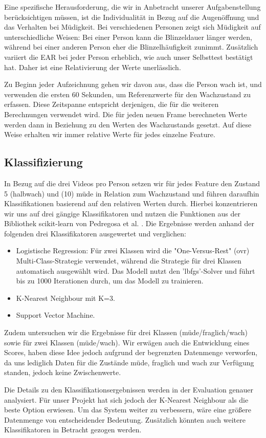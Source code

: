 Eine spezifische Herausforderung, die wir in Anbetracht unserer Aufgabenstellung berücksichtigen müssen, ist die Individualität in Bezug auf die Augenöffnung und das Verhalten bei Müdigkeit. Bei verschiedenen Personen zeigt sich Müdigkeit auf unterschiedliche Weisen: Bei einer Person kann die Blinzeldauer länger werden, während bei einer anderen Person eher die Blinzelhäufigkeit zunimmt. Zusätzlich variiert die EAR bei jeder Person erheblich, wie auch unser Selbsttest bestätigt hat. Daher ist eine Relativierung der Werte unerlässlich.

Zu Beginn jeder Aufzeichnung gehen wir davon aus, dass die Person wach ist, und verwenden die ersten 60 Sekunden, um Referenzwerte für den Wachzustand zu erfassen. Diese Zeitspanne entspricht derjenigen, die für die weiteren Berechnungen verwendet wird. Die für jeden neuen Frame berechneten Werte werden dann in Beziehung zu den Werten des Wachzustands gesetzt. Auf diese Weise erhalten wir immer relative Werte für jedes einzelne Feature.

\subsection{Klassifizierung}
\label{sec:classification}

In Bezug auf die drei Videos pro Person setzen wir für jedes Feature den Zustand 5 (halbwach) und (10) müde in Relation zum Wachzustand und führen daraufhin Klassifikationen basierend auf den relativen Werten durch. Hierbei konzentrieren wir uns auf drei gängige Klassifikatoren und nutzen die Funktionen aus der Bibliothek scikit-learn von Pedregosa et al. \cite{PE11}. Die Ergebnisse werden anhand der folgenden drei Klassifikatoren ausgewertet und verglichen:

\begin{itemize}
\item Logistische Regression: Für zwei Klassen wird die "One-Versus-Rest" (ovr) Multi-Class-Strategie verwendet, während die Strategie für drei Klassen automatisch ausgewählt wird. Das Modell nutzt den 'lbfgs'-Solver und führt bis zu 1000 Iterationen durch, um das Modell zu trainieren.
\item K-Nearest Neighbour mit K=3.
\item Support Vector Machine.
\end{itemize}

Zudem untersuchen wir die Ergebnisse für drei Klassen (müde/fraglich/wach) sowie für zwei Klassen (müde/wach). Wir erwägen auch die Entwicklung eines Scores, haben diese Idee jedoch aufgrund der begrenzten Datenmenge verworfen, da uns lediglich Daten für die Zustände müde, fraglich und wach zur Verfügung standen, jedoch keine Zwischenwerte.

Die Details zu den Klassifikationsergebnissen werden in der Evaluation genauer analysiert. Für unser Projekt hat sich jedoch der K-Nearest Neighbour als die beste Option erwiesen. Um das System weiter zu verbessern, wäre eine größere Datenmenge von entscheidender Bedeutung. Zusätzlich könnten auch weitere Klassifikatoren in Betracht gezogen werden.



